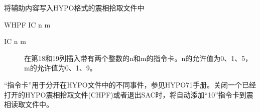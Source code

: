 \label{cmd:whpf}

将辅助内容写入HYPO格式的震相拾取文件中

\begin{SACSTX}
WHPF IC n m
\end{SACSTX}

\begin{description}
\item [IC n m]  在第18和19列插入带有两个整数的n和m的指令卡。n的允许值为0、1、5，m的允许值为0、1、9。
\end{description}

``指令卡''用于分开在HYPO文件中的不同事件，参见HYPO71手册。关闭一个已经打开的HYPO震相拾取文件(CHPF)或者退出SAC时，将自动添加``10''指令卡到震相读取文件中。
